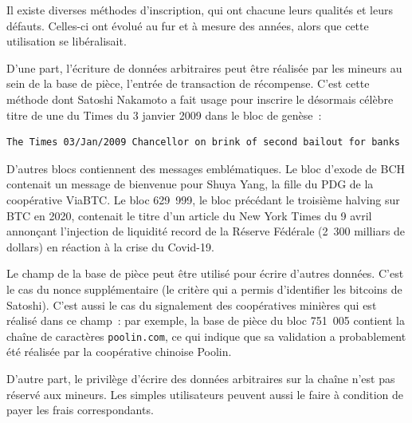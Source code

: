 Il existe diverses méthodes d'inscription, qui ont chacune leurs qualités et leurs défauts. Celles-ci ont évolué au fur et à mesure des années, alors que cette utilisation se libéralisait.

D'une part, l'écriture de données arbitraires peut être réalisée par les mineurs au sein de la base de pièce, l'entrée de transaction de récompense. C'est cette méthode dont Satoshi Nakamoto a fait usage pour inscrire le désormais célèbre titre de une du Times du 3 janvier 2009 dans le bloc de genèse~:

\begin{Verbatim}[fontsize=\footnotesize]
The Times 03/Jan/2009 Chancellor on brink of second bailout for banks
\end{Verbatim}

D'autres blocs contiennent des messages emblématiques. Le bloc d'exode de BCH contenait un message de bienvenue pour Shuya Yang, la fille du PDG de la coopérative ViaBTC. Le bloc 629~999, le bloc précédant le troisième halving sur BTC en 2020, contenait le titre d'un article du New York Times du 9 avril annonçant l'injection de liquidité record de la Réserve Fédérale (2~300 milliars de dollars) en réaction à la crise du Covid-19.

Le champ de la base de pièce peut être utilisé pour écrire d'autres données. C'est le cas du nonce supplémentaire (le critère qui a permis d'identifier les bitcoins de Satoshi). C'est aussi le cas du signalement des coopératives minières qui est réalisé dans ce champ~: par exemple, la base de pièce du bloc 751~005 contient la chaîne de caractères \texttt{poolin.com}, ce qui indique que sa validation a probablement été réalisée par la coopérative chinoise Poolin.

D'autre part, le privilège d'écrire des données arbitraires sur la chaîne n'est pas réservé aux mineurs. Les simples utilisateurs peuvent aussi le faire à condition de payer les frais correspondants.

